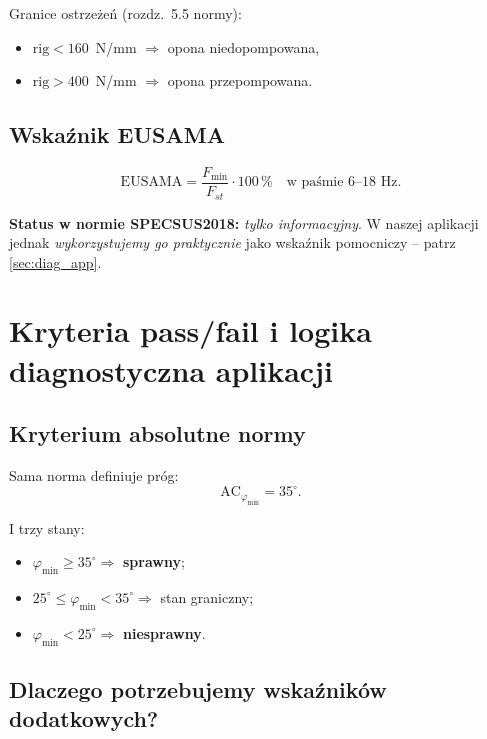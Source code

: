 \documentclass[11pt,a4paper]{article}
\theoremstyle{plainpol}
\begin{document}
Granice ostrzeżeń (rozdz.~5.5 normy):
\begin{itemize}
  \item $\mathrm{rig} < 160$~N/mm $\Rightarrow$ opona niedopompowana,
  \item $\mathrm{rig} > 400$~N/mm $\Rightarrow$ opona przepompowana.
\end{itemize}

\subsection{Wskaźnik EUSAMA}

\begin{equation}
  \mathrm{EUSAMA} = \dfrac{F_{\min}}{F_{st}}\cdot 100\,\% \quad\text{w paśmie 6--18 Hz}.
\end{equation}

\textbf{Status w normie SPECSUS2018:} \emph{tylko informacyjny}. W naszej
aplikacji jednak \emph{wykorzystujemy go praktycznie} jako wskaźnik
pomocniczy -- patrz \cref{sec:diag_app}.

\section{Kryteria pass/fail i logika diagnostyczna aplikacji}\label{sec:kryteria}\label{sec:diag_app}

\subsection{Kryterium absolutne normy}

Sama norma definiuje próg:
\begin{equation}
  \mathrm{AC}_{\varphi_{\min}} = 35^\circ.
\end{equation}

I trzy stany:
\begin{itemize}
  \item $\varphi_{\min} \geq 35^\circ \Rightarrow$ \textbf{sprawny};
  \item $25^\circ \leq \varphi_{\min} < 35^\circ \Rightarrow$ stan graniczny;
  \item $\varphi_{\min} < 25^\circ \Rightarrow$ \textbf{niesprawny}.
\end{itemize}

\subsection{Dlaczego potrzebujemy wskaźników dodatkowych?}
\end{document}
